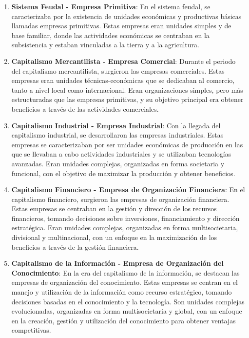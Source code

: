\documentclass[
  letterpaper,
  DIV=11,
  numbers=noendperiod]{scrartcl}
\begin{document}
\begin{enumerate}
\def\labelenumi{\arabic{enumi}.}
\item
  \textbf{Sistema Feudal - Empresa Primitiva}: En el sistema feudal, se
  caracterizaba por la existencia de unidades económicas y productivas
  básicas llamadas empresas primitivas. Estas empresas eran unidades
  simples y de base familiar, donde las actividades económicas se
  centraban en la subsistencia y estaban vinculadas a la tierra y a la
  agricultura.
\item
  \textbf{Capitalismo Mercantilista - Empresa Comercial}: Durante el
  periodo del capitalismo mercantilista, surgieron las empresas
  comerciales. Estas empresas eran unidades técnicas-económicas que se
  dedicaban al comercio, tanto a nivel local como internacional. Eran
  organizaciones simples, pero más estructuradas que las empresas
  primitivas, y su objetivo principal era obtener beneficios a través de
  las actividades comerciales.
\item
  \textbf{Capitalismo Industrial - Empresa Industrial}: Con la llegada
  del capitalismo industrial, se desarrollaron las empresas
  industriales. Estas empresas se caracterizaban por ser unidades
  económicas de producción en las que se llevaban a cabo actividades
  industriales y se utilizaban tecnologías avanzadas. Eran unidades
  complejas, organizadas en forma societaria y funcional, con el
  objetivo de maximizar la producción y obtener beneficios.
\item
  \textbf{Capitalismo Financiero - Empresa de Organización Financiera}:
  En el capitalismo financiero, surgieron las empresas de organización
  financiera. Estas empresas se centraban en la gestión y dirección de
  los recursos financieros, tomando decisiones sobre inversiones,
  financiamiento y dirección estratégica. Eran unidades complejas,
  organizadas en forma multisocietaria, divisional y multinacional, con
  un enfoque en la maximización de los beneficios a través de la gestión
  financiera.
\item
  \textbf{Capitalismo de la Información - Empresa de Organización del
  Conocimiento}: En la era del capitalismo de la información, se
  destacan las empresas de organización del conocimiento. Estas empresas
  se centran en el manejo y utilización de la información como recurso
  estratégico, tomando decisiones basadas en el conocimiento y la
  tecnología. Son unidades complejas evolucionadas, organizadas en forma
  multisocietaria y global, con un enfoque en la creación, gestión y
  utilización del conocimiento para obtener ventajas competitivas.
\end{enumerate}
\end{document}
